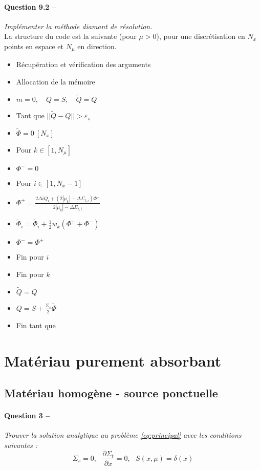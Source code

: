 \documentclass[11pt,a4paper]{article}
\newcommand{\dx}[1]{\dfrac{\partial #1}{\partial x}}
\newcommand{\norm}[1]{\big|\big|#1\big|\big|}
\newcommand{\question}[2]{\paragraph{Question #1 --}\hspace{-7pt}\textit{#2} \\}
\newcommand{\Qt}{\widetilde{Q}}
\newcommand{\Phit}{\widetilde{\Phi}}
\begin{document}
\question{9.2}{Implémenter la méthode diamant de résolution.}

La structure du code est la suivante (pour $\mu>0$), pour une discrétisation en $N_x$ points en espace et $N_{\mu}$ en direction.

\begin{itemize}
\item Récupération et vérification des arguments
\item Allocation de la mémoire
\item $m=0, \quad Q = S, \quad \Qt = Q$
\item[] Tant que $\norm{\Qt - Q}>\varepsilon_s$
  \setlength\itemindent{35pt}
\item $\Phit=0~[N_x]$
\item[] Pour $k\in[1,N_{\mu}]$
  \setlength\itemindent{70pt}
\item $\Phi^- = 0$
\item[] Pour $i\in[1, N_x-1]$
  \setlength\itemindent{105pt}
\item $\Phi^+ = \frac{2 \Delta i Q_i + (2 |\mu_k| - \Delta \Sigma_{t,i}) \Phi^-}{2 |\mu_k| - \Delta \Sigma_{t,i}}$
\item $\Phit_i =  \Phit_i + \frac{1}{2} w_k (\Phi^+ + \Phi^-)$
\item $\Phi^- = \Phi^+$
  \setlength\itemindent{70pt}
\item[] Fin pour $i$
   \setlength\itemindent{35pt}
\item[] Fin pour $k$ 
\item $\Qt = Q$
\item $Q = S + \frac{\Sigma_s}{2} \Phit$
   \setlength\itemindent{0pt}
\item[] Fin tant que  
\end{itemize}


\section{Matériau purement absorbant}

\subsection{Matériau homogène - source ponctuelle}

\question{3}{Trouver la solution analytique au problème \autoref{eq:principal} avec les conditions suivantes :}

\begin{equation}
  \Sigma_s=0, ~~~ \dx{\Sigma_t} = 0, ~~~ S(x, \mu) = \delta(x)
\end{equation}
\end{document}

